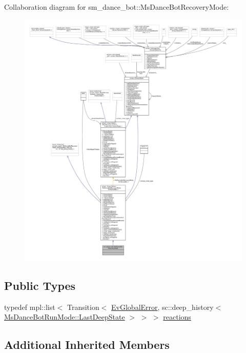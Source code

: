 Collaboration diagram for sm\+\_\+dance\+\_\+bot\+:\+:Ms\+Dance\+Bot\+Recovery\+Mode\+:
\nopagebreak
\begin{figure}[H]
\begin{center}
\leavevmode
\includegraphics[width=350pt]{classsm__dance__bot_1_1MsDanceBotRecoveryMode__coll__graph}
\end{center}
\end{figure}
\subsection*{Public Types}
\begin{DoxyCompactItemize}
\item 
typedef mpl\+::list$<$ Transition$<$ \hyperlink{structsm__dance__bot_1_1EvGlobalError}{Ev\+Global\+Error}, sc\+::deep\+\_\+history$<$ \hyperlink{classsmacc_1_1SmaccState_a60088405d2d99d468caa0baa3b2830a8}{Ms\+Dance\+Bot\+Run\+Mode\+::\+Last\+Deep\+State} $>$ $>$ $>$ \hyperlink{classsm__dance__bot_1_1MsDanceBotRecoveryMode_a2dbd831e931d432508707aa9fcd18529}{reactions}
\end{DoxyCompactItemize}
\subsection*{Additional Inherited Members}


